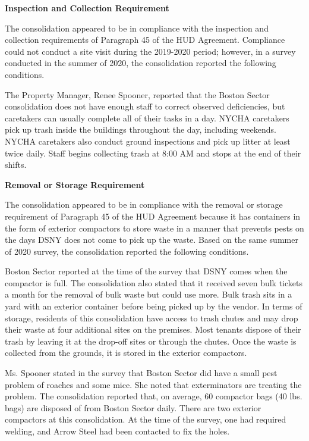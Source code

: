  

\textbf{Inspection and Collection Requirement} 

 

The consolidation appeared to be in compliance with the inspection and collection requirements of Paragraph 45 of the HUD Agreement. Compliance could not conduct a site visit during the 2019-2020 period; however, in a survey conducted in the summer of 2020, the consolidation reported the following conditions.

The Property Manager, Renee Spooner, reported that the Boston Sector consolidation does not have enough staff to correct observed deficiencies, but caretakers can usually complete all of their tasks in a day. NYCHA caretakers pick up trash inside the buildings throughout the day, including weekends. NYCHA caretakers also conduct ground inspections and pick up litter at least twice daily. Staff begins collecting trash at 8:00 AM and stops at the end of their shifts.

\textbf{Removal or Storage Requirement}

The consolidation appeared to be in compliance with the removal or storage requirement of Paragraph  45 of the HUD Agreement because it has containers in the form of exterior compactors to store waste in a manner that prevents pests on the days DSNY does not come to pick up the waste. Based on the same summer of  2020 survey, the consolidation reported the following conditions.

  

Boston Sector reported at the time of the survey that DSNY comes when the compactor is full.  The consolidation also stated that it received seven bulk tickets a month for the removal of bulk waste but could use more. Bulk trash sits in a yard with an exterior container before being picked up by the vendor. In terms of storage, residents of this consolidation have access to trash chutes and may drop their waste at four additional sites on the premises. Most tenants dispose of their trash by leaving it at the drop-off sites or through the chutes. Once the waste is collected from the grounds, it is stored in the exterior compactors.  

Ms. Spooner stated in the survey that Boston Sector did have a small pest problem of roaches and some mice. She noted that exterminators are treating the problem. The consolidation reported that, on average, 60 compactor bags (40 lbs. bags) are disposed of from Boston Sector daily. There are two exterior compactors at this consolidation. At the time of the survey, one had required welding, and Arrow Steel had been contacted to fix the holes. 

